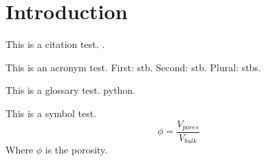 
\section{Introduction} %
\label{sec:introduction}
This is a citation test. \cite{Peaceman1978Interpretation}. \cite{Peaceman2003New}

This is an acronym test. First: \gls{stb}. Second: \gls{stb}. Plural: \glspl{stb}.

This is a glossary test. \gls{python}.

This is a symbol test.
\begin{equation}
    \phi = \frac{V_{pores}}{V_{bulk}}
\end{equation}
Where  $\phi$ is the porosity.
